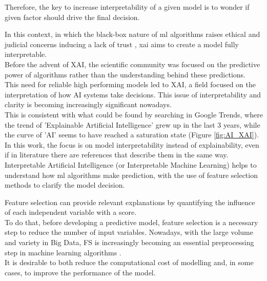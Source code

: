 Therefore, the key to increase interpretability of a given model is to wonder if given factor should drive the final decision.\par
In this context, in which the black-box nature of \acrshort{ml} algorithms raises ethical and judicial concerns inducing a lack of trust \cite{9141213}, \gls{xai} aims to create a model fully interpretable.\\
Before the advent of XAI, the scientific community was focused on the predictive power of algorithms rather than the understanding behind these predictions.\\
This need for reliable high performing models led to XAI, a field focused on the interpretation of how AI systems take decisions.
This issue of interpretability and clarity is becoming increasingly significant nowadays. \\
This is consistent with what could be found by searching in Google Trends, where the trend of 'Explainable Artificial Intelligence' grew up in the last 3 years, while the curve of 'AI' seems to have reached a saturation state (Figure \ref{fig:AI_XAI}).\\
In this work, the focus is on model interpretability instead of explainability, even if in literature there are references that describe them in the same way.
Interpretable Artificial Intelligence (or Interpretable Machine Learning) helps to understand how \acrshort{ml} algorithms make prediction, with the use of feature selection methods to clarify the model decision.\par
Feature selection can provide relevant explanations by quantifying the influence of each independent variable with a score.\\
To do that, before developing a predictive model, feature selection is a necessary step to reduce the number of input variables. \newline
Nowadays, with the large volume and variety in Big Data, FS is increasingly becoming an essential preprocessing step in machine learning algorithms \cite{kamolov2021feature}.\\
It is desirable to both reduce the computational cost of modelling and, in some cases, to improve the performance of the model.\newline
